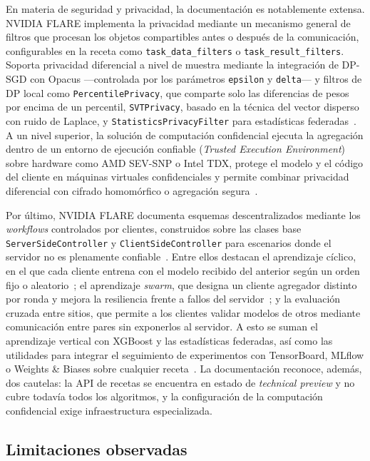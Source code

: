 En materia de seguridad y privacidad, la documentación es notablemente extensa.
NVIDIA FLARE implementa la privacidad mediante un mecanismo general de filtros que
procesan los objetos compartibles antes o después de la comunicación, configurables en
la receta como \texttt{task\_data\_filters} o \texttt{task\_result\_filters}. Soporta
privacidad diferencial a nivel de muestra mediante la integración de DP-SGD con Opacus
—controlada por los parámetros \texttt{epsilon} y \texttt{delta}— y filtros de DP local
como \texttt{PercentilePrivacy}, que comparte solo las diferencias de pesos por encima
de un percentil, \texttt{SVTPrivacy}, basado en la técnica del vector disperso con ruido
de Laplace, y \texttt{StatisticsPrivacyFilter} para estadísticas
federadas~\parencite{nvflareDP}. A un nivel superior, la solución de computación
confidencial ejecuta la agregación dentro de un entorno de ejecución confiable
(\textit{Trusted Execution Environment}) sobre hardware como AMD SEV-SNP o Intel TDX,
protege el modelo y el código del cliente en máquinas virtuales confidenciales y
permite combinar privacidad diferencial con cifrado homomórfico o agregación
segura~\parencite{nvflareSecurity,nvflareConfidential}.

Por último, NVIDIA FLARE documenta esquemas descentralizados mediante los
\textit{workflows} controlados por clientes, construidos sobre las clases base
\texttt{ServerSideController} y \texttt{ClientSideController} para escenarios donde el
servidor no es plenamente confiable~\parencite{nvflareSwarm}. Entre ellos destacan el
aprendizaje cíclico, en el que cada cliente entrena con el modelo recibido del anterior
según un orden fijo o aleatorio~\parencite{nvflareCyclic}; el aprendizaje \textit{swarm},
que designa un cliente agregador distinto por ronda y mejora la resiliencia frente a
fallos del servidor~\parencite{nvflareSwarm}; y la evaluación cruzada entre sitios, que
permite a los clientes validar modelos de otros mediante comunicación entre pares sin
exponerlos al servidor. A esto se suman el aprendizaje vertical con XGBoost y las
estadísticas federadas, así como las utilidades para integrar el seguimiento de
experimentos con TensorBoard, MLflow o Weights \& Biases sobre cualquier
receta~\parencite{nvflareTracking,nvflareRecipes}. La documentación reconoce, además,
dos cautelas: la API de recetas se encuentra en estado de \textit{technical preview} y
no cubre todavía todos los algoritmos, y la configuración de la computación confidencial
exige infraestructura especializada.

\subsection{Limitaciones observadas}\label{subsec:flex-nvflare-lim}

